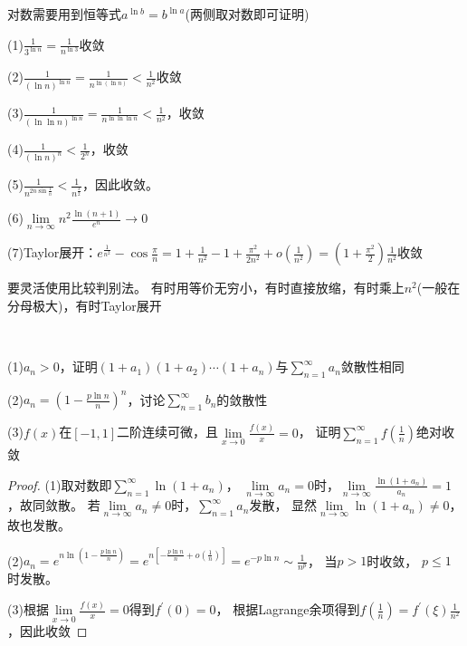 \begin{solution}
  对数需要用到恒等式$a^{\ln b} = b^{\ln a}$(两侧取对数即可证明)
  
  (1)$\frac{1}{3^{\ln n}} = \frac{1}{n^{\ln 3}}$收敛

  (2)$\frac{1}{(\ln n)^{\ln n }} = \frac{1}{n^{\ln( \ln n)}} < \frac{1}{n^2}$收敛

  (3)$\frac{1}{(\ln \ln n)^{\ln n}} = \frac{1}{n^{\ln \ln \ln n}} < \frac{1}{n^2}$，收敛

  (4)$\frac{1}{(\ln n)^n} < \frac{1}{2^n}$，收敛

  (5)$\frac{1}{n^{2n \sin \frac{1}{n}}} < \frac{1}{n^{\frac{3}{2}}}$，因此收敛。

  (6)$\lim \limits _{n \rightarrow \infty} n^2 \frac{\ln (n+1)}{e^n} \rightarrow 0$

  (7)Taylor展开：$e^{\frac{1}{n^2}} - \cos \frac{\pi}{n} = 1 + \frac{1}{n^2} - 1 + \frac{\pi^2}{2n^2} + o(\frac{1}{n^2}) = (1 + \frac{\pi^2}{2})\frac{1}{n^2}$收敛
\end{solution}

\begin{note}
  要灵活使用比较判别法。
  有时用等价无穷小，有时直接放缩，有时乘上$n^2$(一般在分母极大)，有时Taylor展开
\end{note}

~

\begin{exercise}[等价无穷小的进一步应用]
  (1)$a_n > 0$，证明$(1 + a_1)(1 + a_2)\cdots (1 + a_n)$与$\sum\limits_{n = 1}^{\infty}a_n$敛散性相同

  (2)$a_n = (1 - \frac{p \ln n}{n} )^n$，讨论$\sum\limits_{n = 1}^{\infty}b_n$的敛散性

  (3)$f(x)$在$[-1,1]$二阶连续可微，且$\lim \limits _{x \rightarrow 0}\frac{f(x)}{x} = 0$，
  证明$\sum\limits_{n = 1}^{\infty}f(\frac{1}{n})$绝对收敛
\end{exercise}

\begin{proof}
  (1)取对数即$\sum\limits_{n = 1}^{\infty} \ln(1 + a_n)$，
  $\lim \limits _{n \rightarrow \infty} a_n = 0$时，$\lim \limits _{n \rightarrow \infty} \frac{\ln(1 + a_n)}{a_n} = 1$，故同敛散。
  若$\lim \limits _{n \rightarrow \infty} a_n \neq 0$时，$\sum\limits_{n = 1}^{\infty}a_n$发散，
  显然$\lim \limits _{n \rightarrow \infty} \ln(1 + a_n) \neq 0$，故也发散。

  (2)$a_n = e^{n \ln(1 - \frac{p \ln n}{n})} = e^{n[-\frac{p \ln n}{n} + o(\frac{1}{n})]} = e^{-p \ln n} \sim \frac{1}{n^p}$，
  当$p > 1$时收敛，
  $p \leq 1$时发散。

  (3)根据$\lim \limits _{x \rightarrow 0}\frac{f(x)}{x} = 0$得到$f^{\prime}(0) = 0$，
  根据Lagrange余项得到$f(\frac{1}{n}) = f^{\prime}(\xi) \frac{1}{n^2}$，因此收敛
\end{proof}

